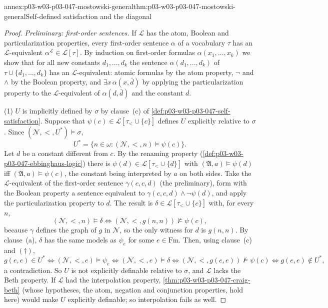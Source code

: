 \begin{annexitem}{annex:p03-w03-p03-047-mostowski-general}{thm:p03-w03-p03-047-mostowski-general}{Self-defined satisfaction and the diagonal}
\begin{proof}
\emph{Preliminary: first-order sentences.}  If \(\mathscr L\) has the atom,
Boolean and particularization properties, every first-order sentence
\(\alpha\) of a vocabulary \(\tau\) has an \(\mathscr L\)-equivalent
\(\alpha^{\mathscr L}\in\mathscr L[\tau]\).  By induction on first-order
formulas \(\alpha(x_1,\dots,x_k)\) we show that for all new constants
\(d_1,\dots,d_k\) the sentence \(\alpha(d_1,\dots,d_k)\) of
\(\tau\cup\{d_1,\dots,d_k\}\) has an \(\mathscr L\)-equivalent: atomic
formulas by the atom property, \(\neg\) and \(\land\) by the Boolean
property, and \(\exists x\,\alpha(x,\bar d)\) by applying the
particularization property to the \(\mathscr L\)-equivalent of
\(\alpha(d,\bar d)\) and the constant \(d\).

(1) \(U\) is implicitly defined by \(\sigma\) by clause~(c) of
\cref{def:p03-w03-p03-047-self-satisfaction}.  Suppose that
\(\psi(c)\in\mathscr L[\tau_<\cup\{c\}]\) defines \(U\) explicitly relative
to \(\sigma\).  Since \((\mathcal N,<,U^\ast)\models\sigma\),
\[
 U^\ast=\{n\in\omega:(\mathcal N,<,n)\models\psi(c)\}.\tag{\(\dagger\)}
\]
Let \(d\) be a constant different from \(c\).  By the renaming property
(\cref{def:p03-w03-p03-047-ebbinghaus-logic}) there is
\(\psi(d)\in\mathscr L[\tau_<\cup\{d\}]\) with
\((\mathfrak A,a)\models\psi(d)\) iff \((\mathfrak A,a)\models\psi(c)\), the
constant being interpreted by \(a\) on both sides.  Take the
\(\mathscr L\)-equivalent of the first-order sentence \(\gamma(c,c,d)\) (the
preliminary), form with the Boolean property a sentence equivalent to
\(\gamma(c,c,d)\land\neg\psi(d)\), and apply the particularization property
to \(d\).  The result is \(\delta\in\mathscr L[\tau_<\cup\{c\}]\) with, for
every \(n\),
\[
 (\mathcal N,<,n)\models\delta
 \iff (\mathcal N,<,g(n,n))\not\models\psi(c),
\]
because \(\gamma\) defines the graph of \(g\) in \(\mathcal N\), so the only
witness for \(d\) is \(g(n,n)\).  By clause~(a), \(\delta\) has the same
models as \(\psi_e\) for some \(e\in\mathrm{Fm}\).  Then, using clause~(c)
and \((\dagger)\),
\[
 g(e,e)\in U^\ast\iff(\mathcal N,<,e)\models\psi_e
 \iff(\mathcal N,<,e)\models\delta
 \iff(\mathcal N,<,g(e,e))\not\models\psi(c)
 \iff g(e,e)\notin U^\ast ,
\]
a contradiction.  So \(U\) is not explicitly definable relative to
\(\sigma\), and \(\mathscr L\) lacks the Beth property.  If \(\mathscr L\)
had the interpolation property, \cref{thm:p03-w03-p03-047-craig-beth} (whose
hypotheses, the atom, negation and conjunction properties, hold here) would
make \(U\) explicitly definable; so interpolation fails as well.


\end{proof}
\end{annexitem}

